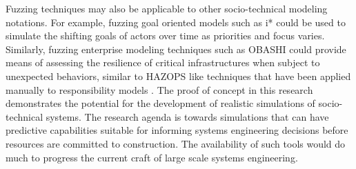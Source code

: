 \documentclass{llncs}
\begin{document}
Fuzzing techniques may also be applicable to other socio-technical modeling notations.  For example, fuzzing goal
oriented models such as i* could be used to simulate the shifting goals of actors over time as priorities and focus
varies.  Similarly, fuzzing enterprise modeling techniques such as OBASHI could provide means of assessing the
resilience of critical infrastructures when subject to unexpected behaviors, similar to HAZOPS like techniques that have
been applied manually to responsibility models \citep{lock09modelling}. The proof of concept in this research demonstrates
the potential for the development of realistic simulations of socio-technical systems. The research agenda is towards
simulations that can have predictive capabilities suitable for informing systems engineering decisions before resources
are committed to construction.  The availability of such tools would do much to progress the current craft of large
scale systems engineering.







\end{document}
